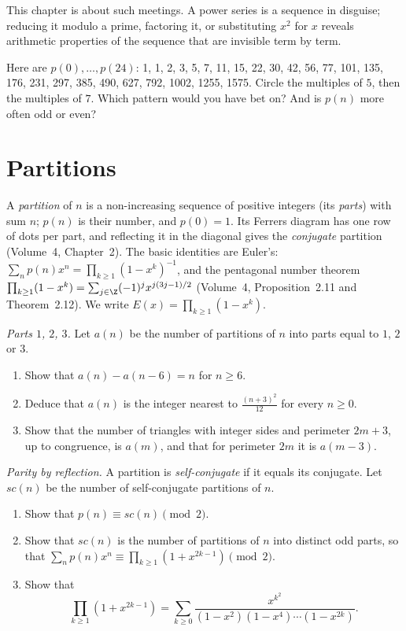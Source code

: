 This chapter is about such meetings. A power series is a sequence in disguise; reducing it modulo a prime, factoring it,
or substituting $x^2$ for $x$ reveals arithmetic properties of the sequence that are invisible term by term.

\begin{think}
Here are $p(0),\dots,p(24)$: 1, 1, 2, 3, 5, 7, 11, 15, 22, 30, 42, 56, 77, 101, 135, 176, 231, 297, 385, 490, 627, 792,
1002, 1255, 1575. Circle the multiples of $5$, then the multiples of $7$. Which pattern would you have bet on? And is $p(n)$
more often odd or even?
\end{think}

\section{Partitions}

A \emph{partition} of $n$ is a non-increasing sequence of positive integers (its \emph{parts}) with sum $n$; $p(n)$ is their number,
and $p(0)=1$. Its Ferrers diagram has one row of dots per part, and reflecting it in the diagonal gives the \emph{conjugate}
partition (Volume~4, Chapter~2). The basic identities are Euler's: $\sum_np(n)x^n=\prod_{k\ge1}(1-x^k)^{-1}$, and the pentagonal
number theorem $\prod_{k\ge1}(1-x^k)=\sum_{j\in\Z}(-1)^jx^{j(3j-1)/2}$ (Volume~4, Proposition~2.11 and Theorem~2.12). We write
$E(x)=\prod_{k\ge1}(1-x^k)$.

\begin{exercise}[$\star\star$]\label{pb:parts123}
\emph{Parts $1$, $2$, $3$.} Let $a(n)$ be the number of partitions of $n$ into parts equal to $1$, $2$ or $3$.
\begin{enumerate}[label=(\alph*)]
\item Show that $a(n)-a(n-6)=n$ for $n\ge6$.
\item Deduce that $a(n)$ is the integer nearest to $\frac{(n+3)^2}{12}$ for every $n\ge0$.
\item Show that the number of triangles with integer sides and perimeter $2m+3$, up to congruence, is $a(m)$, and that for
perimeter $2m$ it is $a(m-3)$.
\end{enumerate}
\end{exercise}

\begin{exercise}[$\star$]\label{pb:selfconj}
\emph{Parity by reflection.} A partition is \emph{self-conjugate} if it equals its conjugate. Let $sc(n)$ be the number of
self-conjugate partitions of $n$.
\begin{enumerate}[label=(\alph*)]
\item Show that $p(n)\equiv sc(n)\pmod2$.
\item Show that $sc(n)$ is the number of partitions of $n$ into distinct odd parts, so that
$\sum_np(n)x^n\equiv\prod_{k\ge1}(1+x^{2k-1})\pmod2$.
\item Show that
\[
\prod_{k\ge1}(1+x^{2k-1})=\sum_{k\ge0}\frac{x^{k^2}}{(1-x^2)(1-x^4)\cdots(1-x^{2k})}.
\]
\end{enumerate}
\end{exercise}

